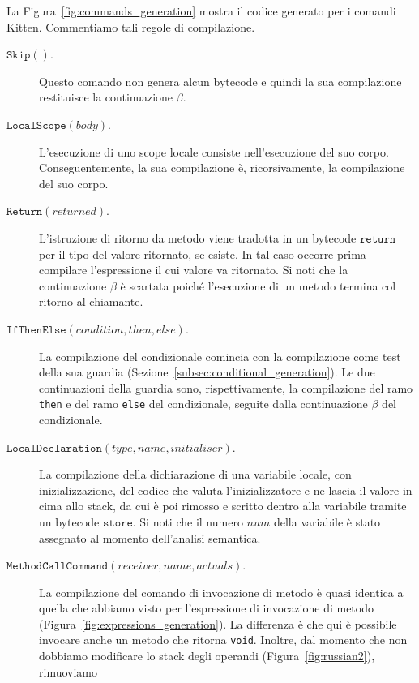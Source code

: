 La Figura~\ref{fig:commands_generation} mostra il codice generato per i
comandi Kitten. Commentiamo tali regole di compilazione.
%
\begin{description}
\item[\underline{$\mathtt{Skip()}$}.] Questo comando non genera alcun
  bytecode e quindi la sua compilazione restituisce la continuazione $\beta$.
\item[\underline{$\mathtt{LocalScope(\mathit{body})}$}.]
  L'esecuzione di uno scope locale consiste nell'esecuzione del suo corpo.
  Conseguentemente, la sua compilazione \`e, ricorsivamente, la compilazione
  del suo corpo.
\item[\underline{$\mathtt{Return(\mathit{returned})}$}.]
  L'istruzione di ritorno da metodo viene tradotta in un bytecode
  $\mathtt{return}$ per il tipo del valore ritornato, se esiste.
  In tal caso occorre prima compilare l'espressione il cui
  valore va ritornato.
  Si noti che la continuazione $\beta$ \`e scartata poich\'e
  l'esecuzione di un metodo termina col ritorno al chiamante.
\item[\underline{$\mathtt{IfThenElse(\mathit{condition},\mathit{then},
  \mathit{else})}$}.]
  La compilazione del condizionale comincia con la compilazione come
  test della sua guardia (Sezione~\ref{subsec:conditional_generation}).
  Le due continuazioni della guardia sono, rispettivamente, la compilazione
  del ramo \texttt{then} e del ramo \texttt{else} del condizionale,
  seguite dalla continuazione $\beta$ del condizionale.
\item[\underline{$\mathtt{LocalDeclaration(\mathit{type},\mathit{name},
  \mathit{initialiser})}$}.]
  La compilazione della dichiarazione di una variabile locale, con
  inizializzazione, \e del codice che
  valuta l'inizializzatore e ne lascia il valore in cima allo stack,
  da cui \`e poi rimosso e scritto dentro alla variabile tramite un bytecode
  $\mathtt{store}$. Si noti che il numero
  $\mathit{num}$ della variabile \`e stato assegnato al momento dell'analisi
  semantica.
\item[\underline{$\mathtt{MethodCallCommand(\mathit{receiver},
  \mathit{name},\mathit{actuals})}$}.]
  La compilazione del comando di invocazione di metodo \`e
  quasi identica a quella che abbiamo visto per l'espressione di
  invocazione di metodo (Figura~\ref{fig:expressions_generation}).
  La differenza \`e che qui \`e possibile invocare anche un metodo che
  ritorna \texttt{void}. Inoltre, dal momento che non dobbiamo modificare
  lo stack degli operandi (Figura~\ref{fig:russian2}), rimuoviamo

\end{description}
